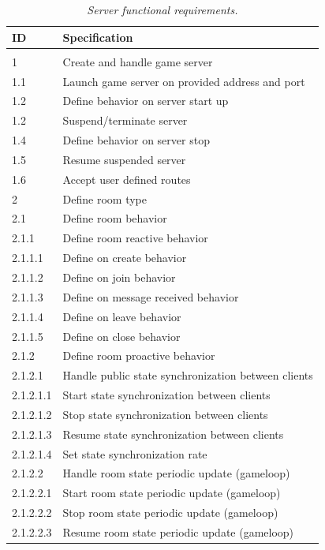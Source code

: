 \begin{center}
  \begin{longtable}{|l|l|} 
    \caption{\textit{Server functional requirements.}} \label{table:server-f-req} \\
  
\hline
ID   &  Specification \\
\hline
\multicolumn{2}{|c|}{} \\
\hline
1         & Create and handle game server \\
1.1       & Launch game server on provided address and port \\
1.2       & Define behavior on server start up \\
1.2       & Suspend/terminate server \\
1.4       & Define behavior on server stop \\
1.5       & Resume suspended server \\
1.6       & Accept user defined routes \\
2         & Define room type \\
2.1       & Define room behavior \\
2.1.1     & Define room reactive behavior \\
2.1.1.1   & Define on create behavior \\
2.1.1.2   & Define on join behavior \\
2.1.1.3   & Define on message received behavior \\
2.1.1.4   & Define on leave behavior \\
2.1.1.5   & Define on close behavior \\
2.1.2     & Define room proactive behavior \\
2.1.2.1   & Handle public state synchronization between clients \\
2.1.2.1.1 & Start state synchronization between clients \\
2.1.2.1.2 & Stop state synchronization between clients \\
2.1.2.1.3 & Resume state synchronization between clients \\
2.1.2.1.4 & Set state synchronization rate\\
2.1.2.2   & Handle room state periodic update (gameloop)  \\ 
2.1.2.2.1 & Start room state periodic update (gameloop) \\
2.1.2.2.2 & Stop room state periodic update (gameloop) \\
2.1.2.2.3 & Resume room state periodic update (gameloop) \\

\end{longtable}
\end{center}
